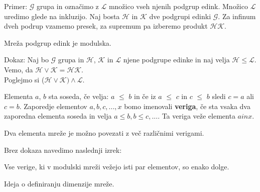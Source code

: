 \documentclass[slovene]{beamer}
\begin{document}
\begin{frame}
\begin{block}{}
Primer: $\mathcal{G}$ grupa in označimo z $\mathcal{L}$ množico vseh  njenih podgrup edink. Množico $\mathcal{L}$ uredimo glede na inkluzijo. Naj bosta $\mathcal{H}$  in $\mathcal{K}$ dve podgrupi edinki $\mathcal{G}$. Za infinum dveh podrup vzamemo presek, za supremum pa izberemo produkt $\mathcal{HK}$.
\end{block}
\end{frame}

\begin{frame}
\begin{theorem}
Mreža podgrup edink je modulska.
\end{theorem}
\end{frame}

\begin{frame}
\begin{block}{Dokaz:}
Naj bo $\mathcal{G}$ grupa in $\mathcal{H}$, $\mathcal{K}$ in $\mathcal{L}$ njene podgrupe edinke in naj velja $\mathcal{H} \leq \mathcal{L}$. Vemo, da $\mathcal{H} \lor \mathcal{K} =\mathcal{H}\mathcal{K}.$\\
Poglejmo si ($\mathcal{H} \lor \mathcal{K}) \land \mathcal{L}$.
\end{block}
\end{frame}

\begin{frame}
\begin{definition}
Elementa $a$, $b$ sta soseda, če velja: $a$ $\leq$ $b$ in če iz $a$ $\leq$ $c$ in $c$ $\leq$ $b$ sledi $c = a$ ali $c = b$.
Zaporedje elementov $a, b, c, ..., x$ bomo imenovali \textbf{veriga}, če sta vsaka dva zaporedna elementa soseda in velja $a \leq b, b \leq c, ...$. Ta veriga veže elementa $a in x.$
\end{definition}
\begin{block}{}
Dva elementa mreže je možno povezati z več različnimi verigami.
\end{block}
\end{frame}

\begin{frame}
\begin{block}{}
Brez dokaza navedimo naslednji izrek:
\end{block}
\begin{theorem}
Vse verige, ki v modulski mreži vežejo isti par elementov, so enako dolge.
\end{theorem}
\begin{block}{}
Ideja o definiranju dimenzije mreže.
\end{block}
\end{frame}
\end{document}
